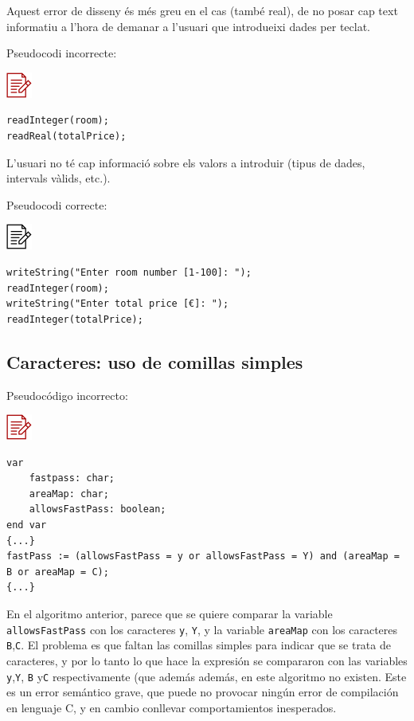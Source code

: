 \documentclass[
]{book}
\begin{document}
Aquest error de disseny és més greu en el cas (també real), de no posar cap text informatiu a l'hora de demanar a l'usuari que introdueixi dades per teclat.

Pseudocodi incorrecte:

\includegraphics{./img/alg_err.png}

\begin{verbatim}
readInteger(room);
readReal(totalPrice);
\end{verbatim}

L'usuari no té cap informació sobre els valors a introduir (tipus de dades, intervals vàlids, etc.).

Pseudocodi correcte:

\includegraphics{./img/alg.png}

\begin{verbatim}
writeString("Enter room number [1-100]: ");
readInteger(room);
writeString("Enter total price [€]: ");
readInteger(totalPrice);
\end{verbatim}

\hypertarget{caracteres-uso-de-comillas-simples}{%
\subsection{Caracteres: uso de comillas simples}\label{caracteres-uso-de-comillas-simples}}

Pseudocódigo incorrecto:

\includegraphics{./img/alg_err.png}

\begin{verbatim}
var
    fastpass: char;
    areaMap: char;
    allowsFastPass: boolean;
end var
{...}
fastPass := (allowsFastPass = y or allowsFastPass = Y) and (areaMap = B or areaMap = C);
{...}
\end{verbatim}

En el algoritmo anterior, parece que se quiere comparar la variable \texttt{allowsFastPass} con los caracteres \texttt{y}, \texttt{Y}, y la variable \texttt{areaMap} con los caracteres \texttt{B},\texttt{C}. El problema es que faltan las comillas simples para indicar que se trata de caracteres, y por lo tanto lo que hace la expresión se compararon con las variables \texttt{y},\texttt{Y}, \texttt{B} y\texttt{C} respectivamente (que además además, en este algoritmo no existen. Este es un error semántico grave, que puede no provocar ningún error de compilación en lenguaje C, y en cambio conllevar comportamientos inesperados.
\end{document}
